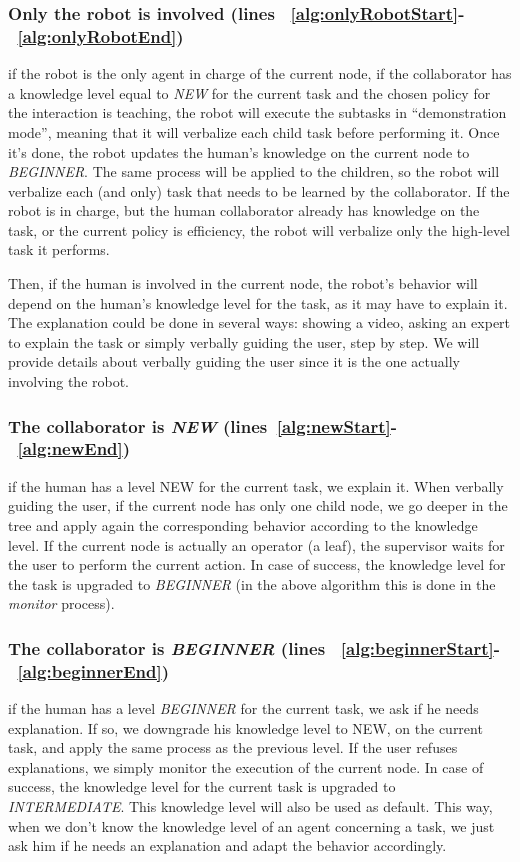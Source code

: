 \subsubsection{Only the robot is involved (lines ~\ref{alg:onlyRobotStart}-~\ref{alg:onlyRobotEnd})} if the robot is the only agent in charge of the current node, if the collaborator has a knowledge level equal to \textit{NEW} for the current task and the chosen policy for the interaction is teaching, the robot will execute the subtasks in ``demonstration mode'', meaning that it will verbalize each child task before performing it. Once it's done, the robot updates the human's knowledge on the current node to \textit{BEGINNER}. The same process will be applied to the children, so the robot will verbalize each (and only) task that needs to be learned by the collaborator.
If the robot is in charge, but the human collaborator already has knowledge on the task, or the current policy is efficiency, the robot will verbalize only the high-level task it performs.

Then, if the human is involved in the current node, the robot's behavior will depend on the human's knowledge level for the task, as it may have to explain it.
The explanation could be done in several ways: showing a video, asking an expert to explain the task or simply verbally guiding the user, step by step. We will provide details about verbally guiding the user since it is the one actually involving the robot. 

\subsubsection{The collaborator is \textit{NEW} (lines~\ref{alg:newStart}-~\ref{alg:newEnd})} if the human has a level NEW for the current task, we explain it.
When verbally guiding the user, if the current node has only one child node, we  go deeper in the tree and apply again the corresponding behavior according to the knowledge level. If the current node is actually an operator (a leaf), the supervisor waits for the user to perform the current action. In case of success, the knowledge level for the task is upgraded to \textit{BEGINNER} (in the above algorithm this is done in the \textit{monitor} process).

\subsubsection{The collaborator is \textit{BEGINNER} (lines ~\ref{alg:beginnerStart}-~\ref{alg:beginnerEnd})} if the human has a level \textit{BEGINNER} for the current task, we ask if he needs explanation. If so, we downgrade his knowledge level to NEW, on the current task, and apply the same process as the previous level. If the user refuses explanations, we simply monitor the execution of the current node. In case of success, the knowledge level for the current task is upgraded to \textit{INTERMEDIATE}. This knowledge level will also be used as default. This way, when we don't know the knowledge level of an agent concerning a task, we just ask him if he needs an explanation and adapt the behavior accordingly.

